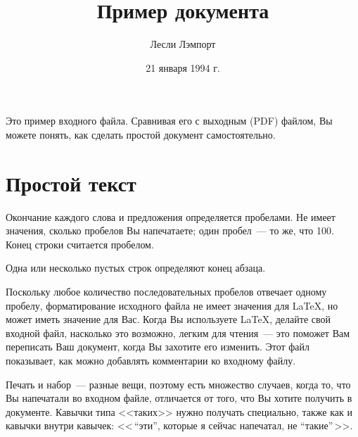 \documentclass{article}      %
\title{Пример документа}     %
\author{Лесли Лэмпорт}       %
\date{21 января 1994 г.}     %
\begin{document}

\maketitle                   %

Это пример входного файла.  Сравнивая его с выходным (PDF)
файлом, Вы можете понять, как
сделать простой документ самостоятельно.

\tableofcontents

\section{Простой текст}      %

Окончание каждого слова и предложения определяется
  пробелами.    Не имеет значения, сколько пробелов Вы
напечатаете;           один пробел~--- то же, что 100.  Конец
строки считается пробелом.

Одна    или   несколько пустых строк определяют  конец
абзаца.

Поскольку любое количество последовательных пробелов отвечает одному
пробелу, форматирование исходного файла не имеет значения
для
      \LaTeX,                %
но может иметь значение для Вас.  Когда Вы используете \LaTeX, делайте
свой входной файл, насколько это возможно, легким для чтения~---
это поможет Вам переписать Ваш документ, когда Вы захотите его изменить.
Этот файл показывает, как можно добавлять комментарии ко входному файлу.

Печать и набор~--- разные вещи, поэтому есть множество случаев,
когда то, что Вы напечатали во входном файле, отличается от того, что
Вы хотите получить в документе. Кавычки типа
        <<таких>>
нужно получать специально, также как и кавычки внутри кавычек:
        <<\,``эти'',        %
        которые я сейчас
        напечатал,
        не  "`такие"'\,>>.
\end{document}
